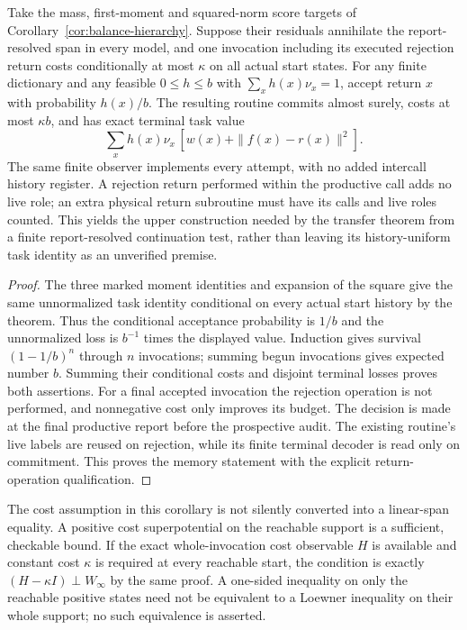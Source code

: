 \begin{corollary}\label{cor:reusable-balance}
Take the mass, first-moment and squared-norm score targets of Corollary~\ref{cor:balance-hierarchy}. Suppose their residuals annihilate the report-resolved span in every model, and one invocation including its executed rejection return costs conditionally at most $\kappa$ on all actual start states. For any finite dictionary and any feasible $0\le h\le b$ with $\sum_x h(x)\nu_x=1$, accept return $x$ with probability $h(x)/b$. The resulting routine commits almost surely, costs at most $\kappa b$, and has exact terminal task value
\[
 \sum_x h(x)\nu_x\,[w(x)+\|f(x)-r(x)\|^2].
\]
The same finite observer implements every attempt, with no added intercall history register. A rejection return performed within the productive call adds no live role; an extra physical return subroutine must have its calls and live roles counted. This yields the upper construction needed by the transfer theorem from a finite report-resolved continuation test, rather than leaving its history-uniform task identity as an unverified premise.
\end{corollary}
\begin{proof}
The three marked moment identities and expansion of the square give the same unnormalized task identity conditional on every actual start history by the theorem. Thus the conditional acceptance probability is $1/b$ and the unnormalized loss is $b^{-1}$ times the displayed value. Induction gives survival $(1-1/b)^n$ through $n$ invocations; summing begun invocations gives expected number $b$. Summing their conditional costs and disjoint terminal losses proves both assertions. For a final accepted invocation the rejection operation is not performed, and nonnegative cost only improves its budget. The decision is made at the final productive report before the prospective audit. The existing routine's live labels are reused on rejection, while its finite terminal decoder is read only on commitment. This proves the memory statement with the explicit return-operation qualification.
\end{proof}

The cost assumption in this corollary is not silently converted into a linear-span equality. A positive cost superpotential on the reachable support is a sufficient, checkable bound. If the exact whole-invocation cost observable $H$ is available and constant cost $\kappa$ is required at every reachable start, the condition is exactly $(H-\kappa I)\perp W_\infty$ by the same proof. A one-sided inequality on only the reachable positive states need not be equivalent to a Loewner inequality on their whole support; no such equivalence is asserted.

